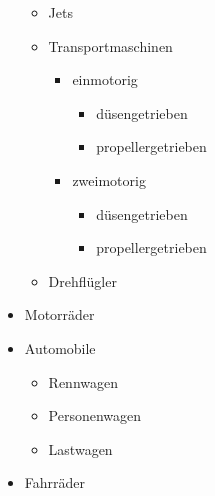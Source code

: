 \begin{Example}
\begin{ShowOutput}[.5\baselineskip]
\begin{itemize}
\begin{itemize}
          \item Jets
          \item Transportmaschinen
            \begin{itemize}
            \item einmotorig
              \begin{itemize}
              \item{düsengetrieben}
              \item{propellergetrieben}
              \end{itemize}
            \item zweimotorig
              \begin{itemize}
              \item{düsengetrieben}
              \item{propellergetrieben}
              \end{itemize}
            \end{itemize}
          \item Drehflügler
          \end{itemize}
        \item Motorräder
        \item Automobile
          \begin{itemize}
          \item Rennwagen
          \item Personenwagen
          \item Lastwagen
          \end{itemize}
        \item Fahrräder
        \end{itemize}
      \end{ShowOutput}
    \end{Example}%
  \fi
  \EndIndexGroup



